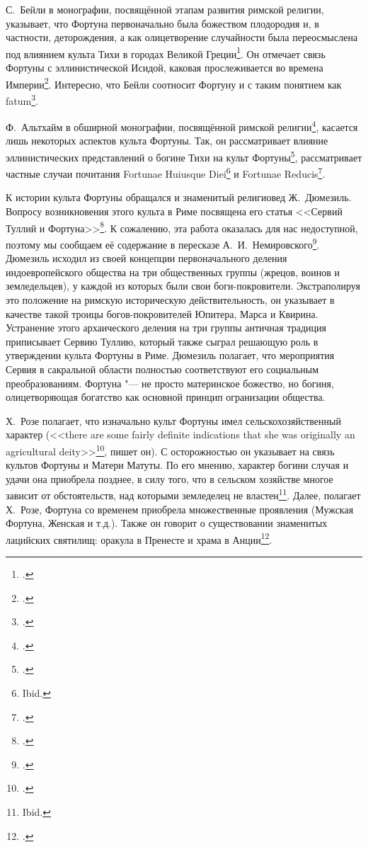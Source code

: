 
С.~Бейли в монографии, посвящённой этапам развития римской религии, указывает, что Фортуна первоначально была божеством плодородия и, в частности, деторождения, а как олицетворение случайности была переосмыслена под влиянием культа Тихи в городах Великой Греции\footcite[P. 137]{Bailey1932}. Он отмечает связь Фортуны с эллинистической Исидой, каковая прослеживается во времена Империи\footcite[P. 255, 258]{Bailey1932}. Интересно, что Бейли соотносит Фортуну и  с таким понятием как fatum\footcite[P. 234, 255]{Bailey1932}.


Ф.~Альтхайм в обширной монографии, посвящённой римской религии\footcite{Altheim1938}, касается лишь некоторых аспектов культа Фортуны. Так, он рассматривает влияние эллинистических представлений о богине Тихи на культ Фортуны\footcite[P. 190]{Altheim1938}, рассматривает частные случаи почитания Fortunae Huiusque Diei\footnote{Ibid.} и Fortunae Reducis\footcite[P. 268]{Altheim1938}.


К истории культа Фортуны обращался и знаменитый религиовед Ж.~Дюмезиль. Вопросу возникновения этого культа в Риме посвящена его статья <<Сервий Туллий и Фортуна>>\footcite{Dumezil1943}. К сожалению, эта работа оказалась для нас недоступной, поэтому мы сообщаем её содержание в пересказе А.~И.~Немировского\footcite[С. 85--86]{Nemirovsky1964}. Дюмезиль исходил из своей концепции первоначального деления индоевропейского общества на три общественных группы (жрецов, воинов и земледельцев), у каждой из которых были свои боги-покровители. Экстраполируя это положение на римскую историческую действительность, он указывает в качестве такой троицы богов-покровителей Юпитера, Марса и Квирина. Устранение этого архаического деления на три группы античная традиция приписывает Сервию Туллию, который также сыграл решающую роль в утверждении культа Фортуны в Риме. Дюмезиль полагает, что мероприятия Сервия в сакральной области полностью соответствуют его социальным преобразованиям. Фортуна "--- не просто материнское божество, но богиня, олицетворяющая богатство как основной принцип огранизации общества.


Х.~Розе полагает, что изначально культ Фортуны имел сельскохозяйственный характер (<<there are some fairly definite indications that she was originally an agricultural deity>>\footcite[P. 238]{Rose1959}, пишет он). С осторожностью он указывает на связь культов Фортуны и Матери Матуты. По его мнению, характер богини случая и удачи она приобрела позднее, в силу того, что в сельском хозяйстве многое зависит от обстоятельств, над которыми земледелец не властен\footnote{Ibid.}. Далее, полагает Х.~Розе, Фортуна со временем приобрела множественные проявления (Мужская Фортуна, Женская и т.д.). Также он говорит о существовании знаменитых лацийских святилищ: оракула в Пренесте и храма в Анции\footcite[P. 238--239]{Rose1959}.


